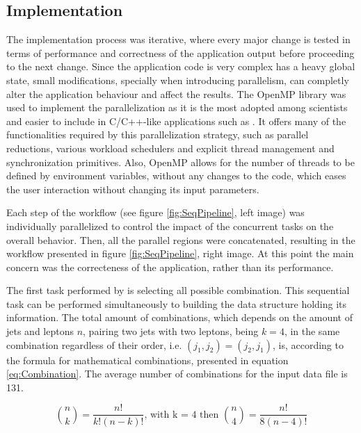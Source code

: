 \subsection{Implementation}
\label{SharedMemImplementation}

The implementation process was iterative, where every major change is tested in terms of performance and correctness of the application output before proceeding to the next change. Since the application code is very complex has a heavy global state, small modifications, specially when introducing parallelism, can completly alter the application behaviour and affect the results. The OpenMP library was used to implement the parallelization as it is the most adopted among scientists and easier to include in C/C++-like applications such as \tth. It offers many of the functionalities required by this parallelization strategy, such as parallel reductions, various workload schedulers and explicit thread management and synchronization primitives. Also, OpenMP allows for the number of threads to be defined by environment variables, without any changes to the code, which eases the user interaction without changing its input parameters.

Each step of the \ttDilepKinFit workflow (see figure \ref{fig:SeqPipeline}, left image) was individually parallelized to control the impact of the concurrent tasks on the overall behavior. Then, all the parallel regions were concatenated, resulting in the workflow presented in figure \ref{fig:SeqPipeline}, right image. At this point the main concern was the correcteness of the application, rather than its performance.

The first task performed by \ttDilepKinFit is selecting all possible combination. This sequential task can be performed simultaneously to building the data structure holding its information. The total amount of combinations, which depends on the amount of jets and leptons $n$, pairing two jets with two leptons, being $k = 4$, in the same combination regardless of their order, i.e. $(j_1, j_2) = (j_2, j_1)$, is, according to the formula for mathematical combinations, presented in equation \ref{eq:Combination}. The average number of combinations for the input data file is 131.

\begin{center}
	\begin{equation}
		\binom{n}{k} = \frac{n!}{k!(n - k)!} \mbox{, with k = 4 then } \binom{n}{4} = \frac{n!}{8(n - 4)!}
		\label{eq:Combination}
	\end{equation}
\end{center}

